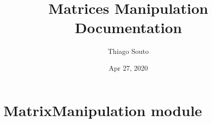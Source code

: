 \documentclass[letterpaper,10pt,english,openany,oneside]{sphinxmanual}
\title{Matrices Manipulation Documentation}
\date{Apr 27, 2020}
\author{Thiago Souto}
\begin{document}
\maketitle
\sphinxtableofcontents
{}\label{\detokenize{index::doc}}



\chapter{MatrixManipulation module}
\label{\detokenize{MatrixManipulation:matrixmanipulation-module}}\label{\detokenize{MatrixManipulation:welcome-to-matrices-manipulation-s-documentation}}\label{\detokenize{MatrixManipulation:module-MatrixManipulation}}\label{\detokenize{MatrixManipulation::doc}}
\end{document}
